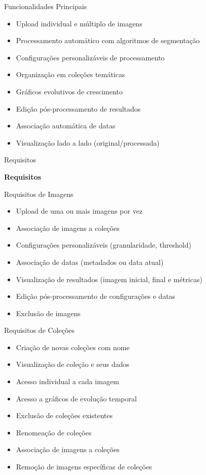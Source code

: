 \documentclass[landscape, 12pt]{beamer}
\begin{document}
\begin{frame}{Funcionalidades Principais}
    \begin{itemize}
        \item Upload individual e múltiplo de imagens
        \item Processamento automático com algoritmos de segmentação
        \item Configurações personalizáveis de processamento
        \item Organização em coleções temáticas
        \item Gráficos evolutivos de crescimento
        \item Edição pós-processamento de resultados
        \item Associação automática de datas
        \item Visualização lado a lado (original/processada)
    \end{itemize}
\end{frame}

\begin{frame}{Requisitos}
    \begin{center}
        \textbf{Requisitos}
    \end{center}
\end{frame}

\begin{frame}{Requisitos de Imagens}
    \begin{itemize}
        \item Upload de uma ou mais imagens por vez
        \item Associação de imagens a coleções
        \item Configurações personalizáveis (granularidade, threshold)
        \item Associação de datas (metadados ou data atual)
        \item Visualização de resultados (imagem inicial, final e métricas)
        \item Edição pós-processamento de configurações e datas
        \item Exclusão de imagens
    \end{itemize}
\end{frame}

\begin{frame}{Requisitos de Coleções}
    \begin{itemize}
        \item Criação de novas coleções com nome
        \item Visualização de coleção e seus dados
        \item Acesso individual a cada imagem
        \item Acesso a gráficos de evolução temporal
        \item Exclusão de coleções existentes
        \item Renomeação de coleções
        \item Associação de imagens a coleções
        \item Remoção de imagens específicas de coleções
    \end{itemize}
\end{frame}
\end{document}
